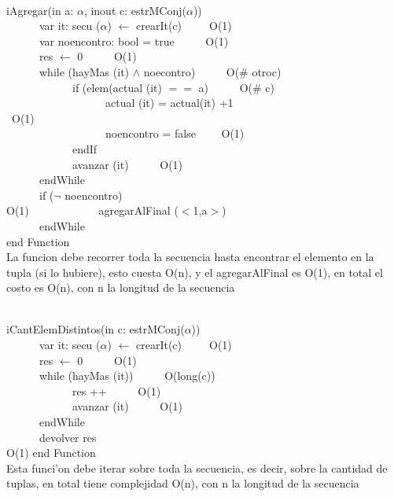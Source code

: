 \documentclass[a4paper,10pt]{article}
\begin{document}
\begin{algoritmo}
\caption{}\\
  iAgregar(in a: $\alpha$, inout c: estrMConj($\alpha$)) \\
	\indent \ \ \ \ \ \  var it: secu ($\alpha$) $\gets$ crearIt(c)\ \ \ \ \ O(1)\\
	\indent \ \ \ \ \ \  var noencontro: bool = true \ \ \ \ \ O(1)\\
	\indent \ \ \ \ \ \  res $\gets$ 0 \ \ \ \ \ O(1)\\
	\indent \ \ \ \ \ \  while (hayMas (it) $\wedge$ noecontro) \ \ \ \ \ O(\# otroc)\\
	\indent \ \ \ \ \ \ \ \ \ \ \ \  if (elem(actual (it) $==$ a)  \ \ \ \ \ O(\# c)\\
	\indent \ \ \ \ \ \ \ \ \ \ \ \ \ \ \ \ \ \ actual (it) = actual(it) +1   \ \ \\ \ O(1)\\
	\indent \ \ \ \ \ \ \ \ \ \ \ \ \ \ \ \ \ \ noencontro = false  \ \ \ \ O(1)\\
	\indent \ \ \ \ \ \ \ \ \ \ \ \  endIf \ \ \ \ \ \\
	\indent \ \ \ \ \ \ \ \ \ \ \ \  avanzar (it) \ \ \ \ \ O(1)\\
	\indent \ \ \ \ \ \ endWhile \ \ \ \ \ \\
	\indent \ \ \ \ \ \ if ($\neg$ noencontro) \ \ \ \ \ \\ O(1)
	\indent \ \ \ \ \ \ \ \ \ \ \ \  agregarAlFinal ($<$1,a$>$) \ \ \ \ \ \\
	\indent \ \ \ \ \ \ endWhile \ \ \ \ \ \\
   end Function \\
   
  La funcion debe recorrer toda la secuencia hasta encontrar el elemento en la tupla (si lo hubiere), esto cuesta O(n), y el agregarAlFinal es O(1), en total el costo es O(n), con n la longitud de la secuencia
\end{algoritmo}

\begin{algoritmo}
\caption{}\\
  iCantElemDistintos(in c: estrMConj($\alpha$)) \\
	\indent \ \ \ \ \ \  var it: secu ($\alpha$) $\gets$ crearIt(c)\ \ \ \ \ O(1)\\
	\indent \ \ \ \ \ \  res $\gets$ 0 \ \ \ \ \ O(1)\\
	\indent \ \ \ \ \ \  while (hayMas (it)) \ \ \ \ \ O(long(c))\\
	\indent \ \ \ \ \ \ \ \ \ \ \ \  res ++ \ \ \ \ \ O(1)\\
	\indent \ \ \ \ \ \ \ \ \ \ \ \  avanzar (it) \ \ \ \ \ O(1)\\
	\indent \ \ \ \ \ \ endWhile \ \ \ \ \ \\
	\indent \ \ \ \ \ \ devolver res \ \ \ \ \ \\ O(1)
   end Function \\
   
   Esta funci'on debe iterar sobre toda la secuencia, es decir, sobre la cantidad de tuplas, en total tiene complejidad O(n), con n la longitud de la secuencia
\end{algoritmo}
\end{document}

